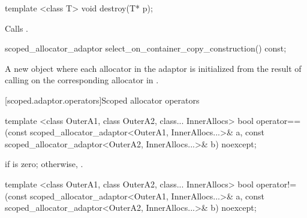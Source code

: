 %
\begin{itemdecl}
template <class T>
  void destroy(T* p);
\end{itemdecl}

\begin{itemdescr}
\pnum
\effects Calls .
\end{itemdescr}

%
\begin{itemdecl}
scoped_allocator_adaptor select_on_container_copy_construction() const;
\end{itemdecl}

\begin{itemdescr}
\pnum
\returns A new  object where each allocator  in the
adaptor is initialized from the result of calling
 on the
corresponding allocator in .
\end{itemdescr}

[scoped.adaptor.operators]{Scoped allocator operators}

%
\begin{itemdecl}
template <class OuterA1, class OuterA2, class... InnerAllocs>
  bool operator==(const scoped_allocator_adaptor<OuterA1, InnerAllocs...>& a,
                  const scoped_allocator_adaptor<OuterA2, InnerAllocs...>& b) noexcept;
\end{itemdecl}

\begin{itemdescr}
\pnum
\returns {} if
 is zero;
otherwise, 
\tcode{\&\&} .
\end{itemdescr}

%
\begin{itemdecl}
template <class OuterA1, class OuterA2, class... InnerAllocs>
  bool operator!=(const scoped_allocator_adaptor<OuterA1, InnerAllocs...>& a,
                  const scoped_allocator_adaptor<OuterA2, InnerAllocs...>& b) noexcept;
\end{itemdecl}

